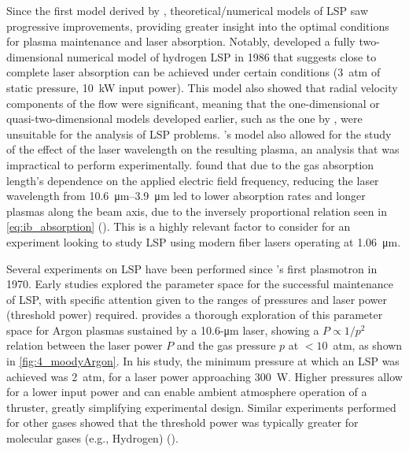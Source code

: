         Since the first model derived by \citeauthor{raizerSUBSONICPROPAGATIONLIGHT1970}, theoretical/numerical models of LSP saw progressive improvements, providing greater insight into the optimal conditions for plasma maintenance and laser absorption. Notably, \textcite{jengNumericalStudyLasersustained1986} developed a fully two-dimensional numerical model of hydrogen LSP in 1986 that suggests close to complete laser absorption can be achieved under certain conditions (3~atm of static pressure, 10~kW input power). This model also showed that radial velocity components of the flow were significant, meaning that the one-dimensional or quasi-two-dimensional models developed earlier, such as the one by \textcite{battehTwoDimensionalGeneralization1974}, were unsuitable for the analysis of LSP problems. \citeauthor{jengNumericalStudyLasersustained1986}'s model also allowed for the study of the effect of the laser wavelength on the resulting plasma, an analysis that was impractical to perform experimentally. \citeauthor{jengNumericalStudyLasersustained1986} found that due to the gas absorption length's dependence on the applied electric field frequency, reducing the laser wavelength from \qtyrange{10.6}{3.9}{\um} led to lower absorption rates and longer plasmas along the beam axis, due to the inversely proportional relation seen in \autoref{eq:ib_absorption} (\textcite{keeferLaserSustainedPlasmas1989}). This is a highly relevant factor to consider for an experiment looking to study LSP using modern fiber lasers operating at \qty{1.06}{\um}.

        Several experiments on LSP have been performed since \citeauthor{generalovContinuousOpticalDischarge1970}'s first plasmotron in 1970. Early studies explored the parameter space for the successful maintenance of LSP, with specific attention given to the ranges of pressures and laser power (threshold power) required. \textcite{moodyMaintenanceGasBreakdown1975} provides a thorough exploration of this parameter space for Argon plasmas sustained by a 10.6-\unit{\um} laser, showing a $P \propto 1/p^2$ relation between the laser power $P$ and the gas pressure $p$ at $<10$~atm, as shown in \autoref{fig:4_moodyArgon}. In his study, the minimum pressure at which an LSP was achieved was 2~atm, for a laser power approaching 300~W. Higher pressures allow for a lower input power and can enable ambient atmosphere operation of a thruster, greatly simplifying experimental design. Similar experiments performed for other gases showed that the threshold power was typically greater for molecular gases (e.g., Hydrogen) (\textcite{keeferLaserSustainedPlasmas1989}).

